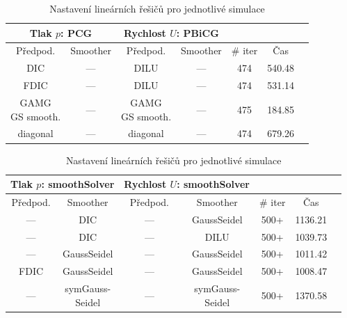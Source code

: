 \documentclass[a4paper,12pt]{report}
\theoremstyle{remark}
\begin{document}
\begin{table}[H]
\centering
\caption{Nastavení lineárních řešičů pro jednotlivé simulace}
\renewcommand{\arraystretch}{1.9}
\begin{tabular}{*7c}
\toprule	

\multicolumn{2}{c}{Tlak $p$: \textbf{PCG}} & \multicolumn{2}{c}{Rychlost $U$: \textbf{PBiCG}}\\		
\midrule
Předpod.&Smoother&Předpod.&Smoother&\# iter&Čas\\
\midrule
 DIC & --- &  DILU & --- &474&540.48\\								
FDIC & --- &  DILU & --- &474&531.14\\	
 \shortstack{GAMG\\GS smooth.}& --- &  \shortstack{GAMG\\GS smooth.}& --- &475&184.85\\	
diagonal & --- & diagonal & ---&474&679.26\\	

		\bottomrule
\end{tabular}

\label{table:solvers_PCG}

\end{table}

 \begin{table}[H]
	\centering
	\caption{Nastavení lineárních řešičů pro jednotlivé simulace}
	\renewcommand{\arraystretch}{1.9}
	\begin{tabular}{*7c}
		\toprule
\multicolumn{2}{c}{Tlak $p$: \textbf{smoothSolver}} & \multicolumn{2}{c}{Rychlost $U$: \textbf{smoothSolver}}\\
\midrule
Předpod.&Smoother&Předpod.&Smoother&\# iter&Čas\\
\midrule		
 --- & DIC &  --- & GaussSeidel &500+&1136.21\\	
 --- & DIC & --- & DILU &500+&1039.73\\
 --- & GaussSeidel &   --- & GaussSeidel &500+&1011.42\\		
 FDIC & GaussSeidel &  --- & GaussSeidel &500+&1008.47\\
 --- & \shortstack{symGauss-\\Seidel} &  --- & \shortstack{symGauss-\\Seidel}&500+&1370.58\\	
\bottomrule
\end{tabular}
	
	\label{table:solvers_smooth}
\end{table}
\end{document}
